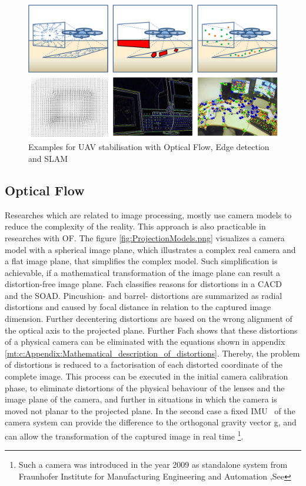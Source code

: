 \begin{figure}[H]
	\centering
		\includegraphics[width=1\textwidth]{graphic/VisualApproaches.png}
	\caption{Examples for UAV stabilisation with Optical Flow, Edge detection and SLAM}
	\label{fig:VisualApproaches.png}
\end{figure}

\subsection{Optical Flow}

Researches which are related to image processing, mostly use camera models to
reduce the complexity of the reality. This approach is also practicable in
researches with \gls{OF}. The figure \ref{fig:ProjectionModels.png}
visualizes a camera model with a spherical image plane, which illustrates a complex real
 camera and a flat image plane, that simplifies the complex model. Such
 simplification is achievable, if a mathematical transformation of the image plane
 can result a distortion-free image plane. Fach  classifies reasons for distortions in a \gls{CACD}~ and the
 \gls{SOAD}. Pincushion- and barrel- distortions are summarized as radial distortions and
caused by focal distance in relation to the captured
image dimension. 
\newpage
Further decentering distortions are based on the wrong alignment
of the optical axis to the projected plane. 
Further Fach 
 shows that these distortions of a
physical camera can be eliminated with the equations shown in appendix
\ref{mt:c:Appendix:Mathematical_description_of_distortions}. Thereby, the problem
of distortions is reduced to a factorisation of each distorted coordinate of the complete image.
 This process can be executed in the initial camera calibration
 phase, to eliminate distortions of the physical behaviour of the
lenses and the image plane of the camera, and further in situations in which the
camera is moved not planar to the projected plane. In the second case a fixed
\gls{IMU}~ of the camera system can provide the difference to the orthogonal gravity vector
g, and can allow the transformation of the captured image in real time
\footnote{Such a camera was introduced in the year 2009 as standalone system from
Fraunhofer Institute for Manufacturing Engineering and Automation ,See
}.

